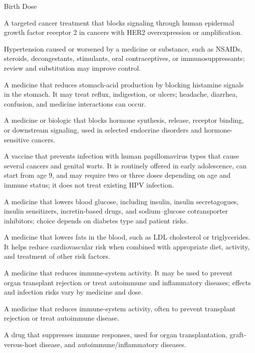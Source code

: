 \synonyms
Birth Dose

 A targeted cancer treatment that blocks signaling through human epidermal growth factor receptor 2 in cancers with HER2 overexpression or amplification.

 Hypertension caused or worsened by a medicine or substance, such as NSAIDs, steroids, decongestants, stimulants, oral contraceptives, or immunosuppressants; review and substitution may improve control.

 A medicine that reduces stomach-acid production by blocking histamine signals in the stomach. It may treat reflux, indigestion, or ulcers; headache, diarrhea, confusion, and medicine interactions can occur.

 A medicine or biologic that blocks hormone synthesis, release, receptor binding, or downstream signaling, used in selected endocrine disorders and hormone-sensitive cancers.

 A vaccine that prevents infection with human papillomavirus types that cause several cancers and genital warts. It is routinely offered in early adolescence, can start from age 9, and may require two or three doses depending on age and immune status; it does not treat existing HPV infection.

 A medicine that lowers blood glucose, including insulin, insulin secretagogues, insulin sensitizers, incretin-based drugs, and sodium--glucose cotransporter inhibitors; choice depends on diabetes type and patient risks.

 A medicine that lowers fats in the blood, such as LDL cholesterol or triglycerides. It helps reduce cardiovascular risk when combined with appropriate diet, activity, and treatment of other risk factors.


 A medicine that reduces immune-system activity. It may be used to prevent organ transplant rejection or treat autoimmune and inflammatory diseases; effects and infection risks vary by medicine and dose.

 A medicine that reduces immune-system activity, often to prevent transplant rejection or treat autoimmune disease.

 A drug that suppresses immune responses, used for organ transplantation,
graft-versus-host disease, and autoimmune/inflammatory diseases.

